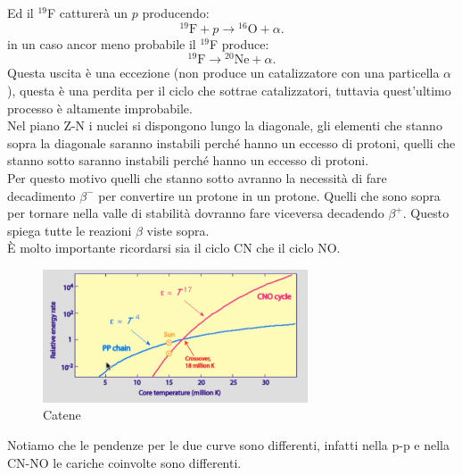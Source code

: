Ed il ${}^{19}$F catturerà un $p$  producendo:
\[
{}^{19}\text{F}+p\to {}^{16}\text{O}+\alpha
.\] 
in un caso ancor meno probabile il ${}^{19}$F produce:
\[
{}^{19}\text{F}\to {}^{20}\text{Ne}+\alpha
.\] 
Questa uscita è una eccezione (non produce un catalizzatore con una particella $\alpha$), questa è una perdita per il ciclo che sottrae catalizzatori,
tuttavia quest'ultimo processo è altamente improbabile.\\
Nel piano Z-N i nuclei si dispongono lungo la diagonale, gli elementi che stanno sopra la diagonale saranno instabili perché hanno un eccesso di protoni, quelli che stanno sotto saranno instabili perché hanno un eccesso di protoni. \\
Per questo motivo quelli che stanno sotto avranno la necessità di fare decadimento $\beta^-$ per convertire un protone in un protone. Quelli che sono sopra per tornare nella valle di stabilità dovranno fare viceversa decadendo $\beta^+$. Questo spiega tutte le reazioni $\beta$ viste sopra. \\
È molto importante ricordarsi sia il ciclo CN che il ciclo NO.
\begin{figure}[H]
    \centering
    \includegraphics[width=0.7\textwidth]{figures/catene.png}
    \caption{Catene}
    \label{fig:fi}
\end{figure}
\noindent
Notiamo che le pendenze per le due curve sono differenti, infatti nella p-p e nella CN-NO le cariche coinvolte sono differenti.
